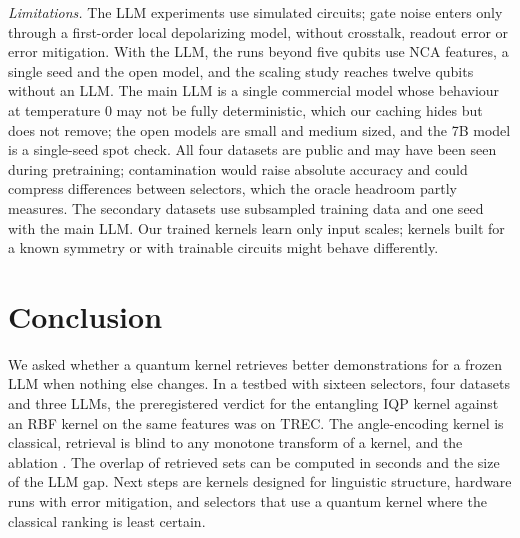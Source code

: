 \emph{Limitations.} The LLM experiments use simulated circuits; gate noise enters only through a
first-order local depolarizing model, without crosstalk, readout error or error mitigation. With the
LLM, the runs beyond five qubits use NCA features, a single seed and the open model, and the scaling study
reaches twelve qubits without an LLM. The main LLM is a single commercial model whose behaviour at
temperature 0 may not be fully deterministic, which our caching hides but does not remove; the open
models are small and medium sized, and the 7B model is a single-seed spot check. All four datasets are
public and may have been seen during pretraining; contamination would raise absolute accuracy and could
compress differences between selectors, which the oracle headroom partly measures. The secondary datasets
use subsampled training data and one seed with the main LLM. Our trained kernels learn only input scales;
kernels built for a known symmetry \cite{glick2024covariant} or with trainable circuits
\cite{hubregtsen2022training} might behave differently.

\section{Conclusion}
We asked whether a quantum kernel retrieves better demonstrations for a frozen LLM when nothing else
changes. In a testbed with sixteen selectors, four datasets and three LLMs, the preregistered verdict for
the entangling IQP kernel against an RBF kernel on the same features was \emph{\RVerdictTrecMain} on TREC.
\TOtherDatasets{} The angle-encoding kernel is classical, retrieval is blind to any monotone transform of a
kernel, and the ablation \TAbsAblation{}. The overlap of retrieved sets can be computed in seconds and
\TConclScreen{} the size of the LLM gap. \TConclStudies{} Next steps are kernels designed for linguistic
structure, hardware runs with error mitigation, and selectors that use a quantum kernel where the classical
ranking is least certain.

\paperack{\PaperAckText}





